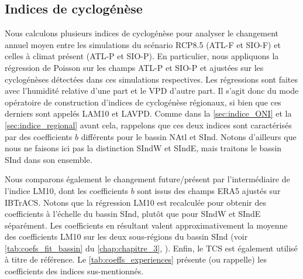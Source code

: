 \documentclass[../main.tex]{subfiles}
\begin{document}
\subsection{Indices de cyclogénèse}

Nous calculons plusieurs indices de cyclogénèse pour analyser le changement annuel moyen entre les simulations du scénario RCP8.5 (ATL-F et SIO-F) et celles à
climat présent (ATL-P et SIO-P). En particulier, nous appliquons la régression de Poisson sur les champs ATL-P et SIO-P et ajustées sur les cyclogénèses
détectées dans ces simulations respectives. Les régressions sont faites avec l'humidité relative d'une part et le VPD d'autre part. Il s'agit donc du mode
opératoire de construction d'indices de cyclogénèse régionaux, si bien que ces derniers sont appelés LAM10 et LAVPD. Comme dans la \cref{sec:indice_ONI} et la
\cref{sec:indice_regional} avant cela, rappelons que ces deux indices sont caractérisés par des coefficients $b$ différents pour le bassin NAtl et SInd. Notons
d'ailleurs que nous ne faisons ici pas la distinction SIndW et SIndE, mais traitons le bassin SInd dans son ensemble.

Nous comparons également le changement future/présent par l'intermédiaire de l'indice LM10, dont les coefficients $b$ sont issus des champs ERA5 ajustés sur
IBTrACS. Notons que la régression LM10 est recalculée pour obtenir des coefficients à l'échelle du bassin SInd, plutôt que pour SIndW et SIndE séparément. Les
coefficients en résultant valent approximativement la moyenne des coefficients LM10 sur les deux sous-régions du bassin SInd (voir \cref{tab:coefs_fit_bassin}
du \cref{chap:chapitre_3}, ). Enfin, le TCS est également utilisé à titre de référence. Le \cref{tab:coeffs_experiences} présente
(ou rappelle) les coefficients des indices sus-mentionnés.
\end{document}
